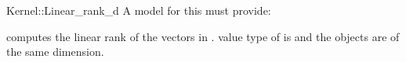 \begin{ccRefFunctionObjectConcept}{Kernel::Linear_rank_d}
A model for this must provide:


{computes the linear rank of the vectors in \ccc{A = tuple [first,last)}.
\ccPrecond value type of  is 
and the objects are of the same dimension.}

\end{ccRefFunctionObjectConcept}
